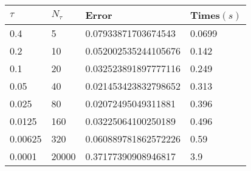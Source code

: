 \begin{tabular}{llll} 
\hline 
$\tau$  & $N_\tau$  &  Error & Times$(s)$  \\ 
\hline \hline 
0.4  & 5 & \num{0.07933871703674543} & 0.0699 \\ 
0.2  & 10 & \num{0.052002535244105676} & 0.142 \\ 
0.1  & 20 & \num{0.032523891897777116} & 0.249 \\ 
0.05  & 40 & \num{0.021453423832798652} & 0.313 \\ 
0.025  & 80 & \num{0.02072495049311881} & 0.396 \\ 
0.0125  & 160 & \num{0.03225064100250189} & 0.496 \\ 
0.00625  & 320 & \num{0.060889781862572226} & 0.59 \\ 
0.0001  & 20000 & \num{0.37177390908946817} & 3.9 \\ 
\hline 
\end{tabular} 
